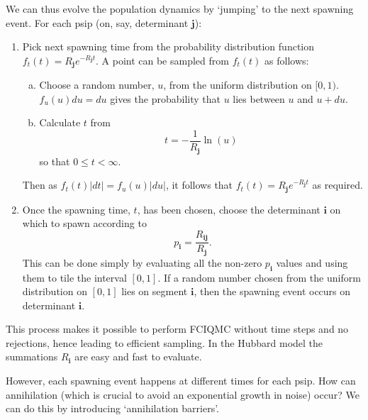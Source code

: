 \documentclass[a4paper, 11pt]{article}
\newcommand{\bi}{\mathbf{i}}
\newcommand{\bj}{\mathbf{j}}
\begin{document}
We can thus evolve the population dynamics by `jumping' to the next spawning event.  For each psip (on, say, determinant $\bj$):
\begin{enumerate}
\item Pick next spawning time from the probability distribution function $f_t(t) = R_\bj e^{-R_\bj t}$.  A point can be sampled from $f_t(t)$ as follows:
    \begin{enumerate}[a)]
    \item Choose a random number, $u$, from the uniform distribution on $[0,1)$. $f_u(u) du = du$ gives the probability that $u$ lies between $u$ and $u+du$.
    \item Calculate $t$ from
    \begin{equation}
    t = - \frac{1}{R_\bj} \ln(u)
    \end{equation}
    so that $0 \le t < \infty$. 
    \end{enumerate}
Then as $f_t(t) |dt| = f_u(u) |du|$, it follows that $f_t(t) = R_\bj e^{-R_\bj t}$ as required.
\item Once the spawning time, $t$, has been chosen, choose the determinant $\bi$ on which to spawn according to
\begin{equation}
p_\bi = \frac{R_{\bi\bj}}{R_\bj}.
\end{equation}
This can be done simply by evaluating all the non-zero $p_\bi$ values and using them to tile the interval $[0,1]$.  If a random number chosen from the uniform distribution on $[0,1]$ lies on segment $\bi$, then the spawning event occurs on determinant $\bi$.
\end{enumerate}

This process makes it possible to perform FCIQMC without time steps and no rejections, hence leading to efficient sampling.  In the Hubbard model the summations $R_\bi$ are easy and fast to evaluate.

However, each spawning event happens at different times for each psip.  How can annihilation (which is crucial to avoid an exponential growth in noise) occur?  We can do this by introducing `annihilation barriers'.
\end{document}
